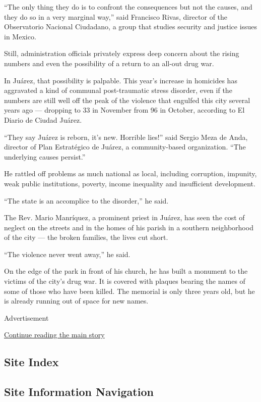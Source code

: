 ``The only thing they do is to confront the consequences but not the
causes, and they do so in a very marginal way,'' said Francisco Rivas,
director of the Observatorio Nacional Ciudadano, a group that studies
security and justice issues in Mexico.

Still, administration officials privately express deep concern about the
rising numbers and even the possibility of a return to an all-out drug
war.

In Juárez, that possibility is palpable. This year's increase in
homicides has aggravated a kind of communal post-traumatic stress
disorder, even if the numbers are still well off the peak of the
violence that engulfed this city several years ago --- dropping to 33 in
November from 96 in October, according to El Diario de Ciudad Juárez.

``They say Juárez is reborn, it's new. Horrible lies!'' said Sergio Meza
de Anda, director of Plan Estratégico de Juárez, a community-based
organization. ``The underlying causes persist.''

He rattled off problems as much national as local, including corruption,
impunity, weak public institutions, poverty, income inequality and
insufficient development.

``The state is an accomplice to the disorder,'' he said.

The Rev. Mario Manríquez, a prominent priest in Juárez, has seen the
cost of neglect on the streets and in the homes of his parish in a
southern neighborhood of the city --- the broken families, the lives cut
short.

``The violence never went away,'' he said.

On the edge of the park in front of his church, he has built a monument
to the victims of the city's drug war. It is covered with plaques
bearing the names of some of those who have been killed. The memorial is
only three years old, but he is already running out of space for new
names.

Advertisement

\protect\hyperlink{after-bottom}{Continue reading the main story}

\hypertarget{site-index}{%
\subsection{Site Index}\label{site-index}}

\hypertarget{site-information-navigation}{%
\subsection{Site Information
Navigation}\label{site-information-navigation}}


